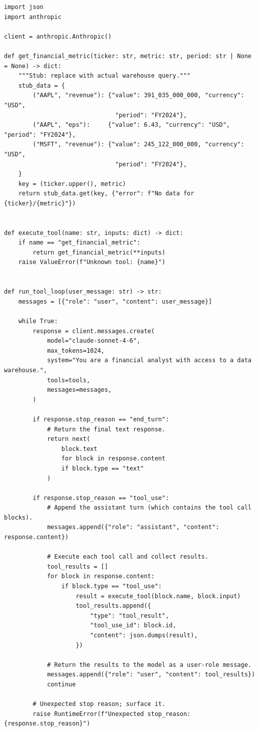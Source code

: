 \begin{verbatim}
import json
import anthropic

client = anthropic.Anthropic()

def get_financial_metric(ticker: str, metric: str, period: str | None = None) -> dict:
    """Stub: replace with actual warehouse query."""
    stub_data = {
        ("AAPL", "revenue"): {"value": 391_035_000_000, "currency": "USD",
                               "period": "FY2024"},
        ("AAPL", "eps"):     {"value": 6.43, "currency": "USD", "period": "FY2024"},
        ("MSFT", "revenue"): {"value": 245_122_000_000, "currency": "USD",
                               "period": "FY2024"},
    }
    key = (ticker.upper(), metric)
    return stub_data.get(key, {"error": f"No data for {ticker}/{metric}"})


def execute_tool(name: str, inputs: dict) -> dict:
    if name == "get_financial_metric":
        return get_financial_metric(**inputs)
    raise ValueError(f"Unknown tool: {name}")


def run_tool_loop(user_message: str) -> str:
    messages = [{"role": "user", "content": user_message}]

    while True:
        response = client.messages.create(
            model="claude-sonnet-4-6",
            max_tokens=1024,
            system="You are a financial analyst with access to a data warehouse.",
            tools=tools,
            messages=messages,
        )

        if response.stop_reason == "end_turn":
            # Return the final text response.
            return next(
                block.text
                for block in response.content
                if block.type == "text"
            )

        if response.stop_reason == "tool_use":
            # Append the assistant turn (which contains the tool call blocks).
            messages.append({"role": "assistant", "content": response.content})

            # Execute each tool call and collect results.
            tool_results = []
            for block in response.content:
                if block.type == "tool_use":
                    result = execute_tool(block.name, block.input)
                    tool_results.append({
                        "type": "tool_result",
                        "tool_use_id": block.id,
                        "content": json.dumps(result),
                    })

            # Return the results to the model as a user-role message.
            messages.append({"role": "user", "content": tool_results})
            continue

        # Unexpected stop reason; surface it.
        raise RuntimeError(f"Unexpected stop_reason: {response.stop_reason}")
\end{verbatim}

